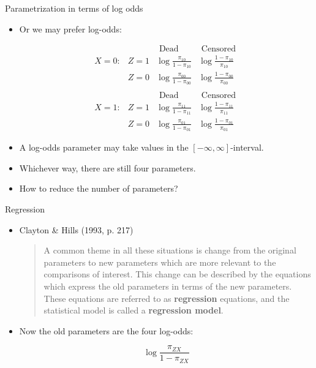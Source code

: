 \documentclass[10pt,handout]{beamer}\usepackage[]{graphicx}\usepackage[]{color}
\begin{document}
\begin{frame}{Parametrization in terms of log odds}
	\begin{itemize}
		\item Or we may prefer log-odds:
		
		$$
		\begin{array}{llcc} 
		&      & \text { Dead } & \text { Censored } \\
		X=0: & Z=1 & \log\frac{\pi_{10}}{1-\pi_{10}} & \log\frac{1-\pi_{10}}{\pi_{10}} \\
		& Z=0 & \log\frac{\pi_{00}}{1- \pi_{00}} & \log\frac{1-\pi_{00}}{\pi_{00}} \\
		& & & \\
		&  & \text { Dead } & \text { Censored } \\
		X=1:&  Z=1 & \log\frac{\pi_{11}}{1-\pi_{11}}      & \log\frac{1-\pi_{11}}{\pi_{11}} \\
		&  Z=0    & \log\frac{\pi_{01}}{1-\pi_{01}} & \log\frac{1-\pi_{01}}{\pi_{01}}
		\end{array}
		$$
		
		\item A log-odds parameter may take values in the $[-\infty, \infty]$-interval.
		\item Whichever way, there are still four parameters.
		\item How to reduce the number of parameters?
	\end{itemize}
\end{frame}


\begin{frame}{Regression}
	\begin{itemize}
		\item Clayton \& Hills (1993, p. 217)
		\begin{quote}
			A common theme in all these situations is change
			from the original parameters to new parameters
			which are more relevant to the comparisons of
			interest. This change can be described by the
			equations which express the old parameters in
			terms of the new parameters. These equations
			are referred to as \textbf{regression} equations, and the
			statistical model is called a \textbf{regression model}.
		\end{quote}
	
	\item Now the old parameters are the four log-odds:
	
	$$
	\log \frac{\pi_{ZX}}{1-\pi_{ZX}}
	$$
	
	\end{itemize}
\end{frame}
\end{document}

